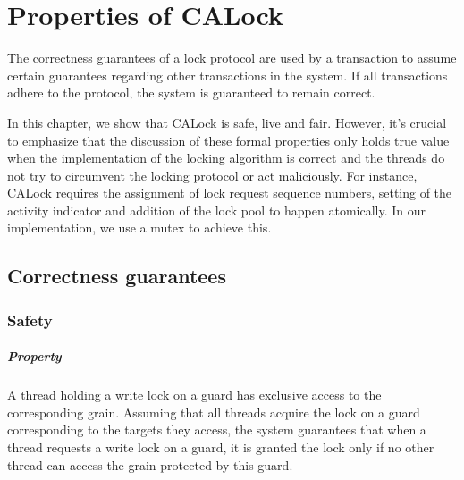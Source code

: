 \chapter{Properties of CALock} \label{chap:formalProperties}

\minitoc

The correctness guarantees of a lock protocol are used by a transaction to assume certain guarantees regarding other transactions in the system. If all transactions adhere to the protocol, the system is guaranteed to remain correct.

In this chapter, we show that CALock is safe, live and fair. 
However, it's crucial to emphasize that the discussion of these formal properties only holds true value when the implementation of the locking algorithm is correct and the threads do not try to circumvent the locking protocol or act maliciously. 
For instance, CALock requires the assignment of lock request sequence numbers, setting of the activity indicator and addition of the lock pool to happen atomically. In our implementation, we use a mutex to achieve this. 
%
\section{Correctness guarantees}

\subsection[Safety]{Safety}


\paragraph{Property} A thread holding a write lock on a guard has exclusive access to the corresponding grain. Assuming that all threads acquire the lock on a guard corresponding to the targets they access, the system guarantees that when a thread requests a write lock on a guard, it is granted the lock only if no other thread can access the grain protected by this guard.

